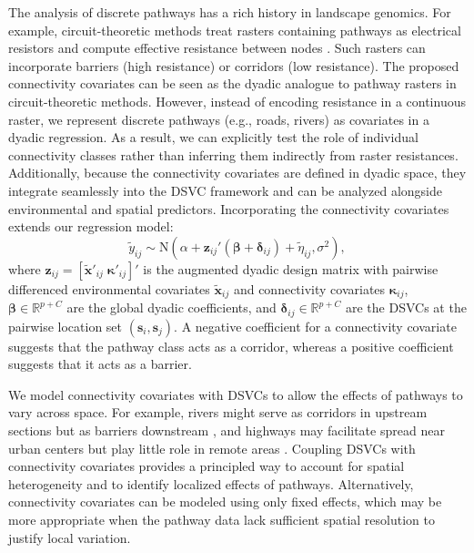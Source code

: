 \documentclass{article}
\begin{document}
The analysis of discrete pathways has a rich history in landscape genomics. For example, circuit-theoretic methods treat rasters containing pathways as electrical resistors and compute effective resistance between nodes \citep{mcrae2006isolation}. Such rasters can incorporate barriers (high resistance) or corridors (low resistance). The proposed connectivity covariates can be seen as the dyadic analogue to pathway rasters in circuit-theoretic methods. However, instead of encoding resistance in a continuous raster, we represent discrete pathways (e.g., roads, rivers) as covariates in a dyadic regression. As a result, we can explicitly test the role of individual connectivity classes rather than inferring them indirectly from raster resistances. Additionally, because the connectivity covariates are defined in dyadic space, they integrate seamlessly into the DSVC framework and can be analyzed alongside environmental and spatial predictors. Incorporating the connectivity covariates extends our regression model:
\begin{equation}\label{eq:kappa-SVCs}
    \widetilde{y}_{ij}\sim \text{N}\left(\alpha+\mathbf{z}_{ij}'(\boldsymbol{\beta} + \boldsymbol\delta_{ij}) + \widetilde{\eta}_{ij},\sigma^2\right),
\end{equation}
where $\mathbf{z}_{ij}=[\mathbf{\widetilde{x}}'_{ij} \; \boldsymbol\kappa'_{ij}]'$ is the augmented dyadic design matrix with pairwise differenced environmental covariates $\widetilde{\mathbf{x}}_{ij}$ and connectivity covariates $\boldsymbol\kappa_{ij}$, $\boldsymbol\beta\in\mathbb{R}^{p+C}$ are the global dyadic coefficients, and $\boldsymbol\delta_{ij}\in\mathbb{R}^{p+C}$ are the DSVCs at the pairwise location set $(\mathbf{s}_i,\mathbf{s}_j)$. 
A negative coefficient for a connectivity covariate suggests that the pathway class acts as a corridor, whereas a positive coefficient suggests that it acts as a barrier. 

We model connectivity covariates with DSVCs to allow the effects of pathways to vary across space. For example, rivers might serve as corridors in upstream sections but as barriers downstream \citep{bartakova2015terrestrial,erHos2019landscape}, and highways may facilitate spread near urban centers but play little role in remote areas \citep{medley2015human}. Coupling DSVCs with connectivity covariates provides a principled way to account for spatial heterogeneity and to identify localized effects of pathways.
Alternatively, connectivity covariates can be modeled using only fixed effects, which may be more appropriate when the pathway data lack sufficient spatial resolution to justify local variation. 
\end{document}
